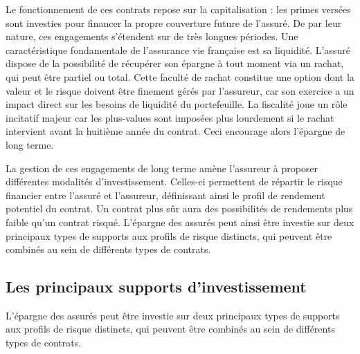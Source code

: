 Le fonctionnement de ces contrats repose sur la capitalisation : les primes versées sont investies pour financer la propre couverture future de l'assuré. De par leur nature, ces engagements s'étendent sur de très longues périodes. Une caractéristique fondamentale de l'assurance vie française est sa liquidité. L'assuré dispose de la possibilité de récupérer son épargne à tout moment via un rachat, qui peut être partiel ou total. Cette faculté de rachat constitue une option dont la valeur et le risque doivent être finement gérés par l'assureur, car son exercice a un impact direct sur les besoins de liquidité du portefeuille. La fiscalité joue un rôle incitatif majeur car les plus-values sont imposées plus lourdement si le rachat intervient avant la huitième année du contrat. Ceci encourage alors l'épargne de long terme.

La gestion de ces engagements de long terme amène l'assureur à proposer différentes modalités d'investissement. Celles-ci permettent de répartir le risque financier entre l'assuré et l'assureur, définissant ainsi le profil de rendement potentiel du contrat. Un contrat plus sûr aura des possibilités de rendements plus faible qu'un contrat risqué. L'épargne des assurés peut ainsi être investie sur deux principaux types de supports aux profils de risque distincts, qui peuvent être combinés au sein de différents types de contrats.

\subsection{Les principaux supports d'investissement}

L'épargne des assurés peut être investie sur deux principaux types de supports aux profils de risque distincts, qui peuvent être combinés au sein de différents types de contrats.



